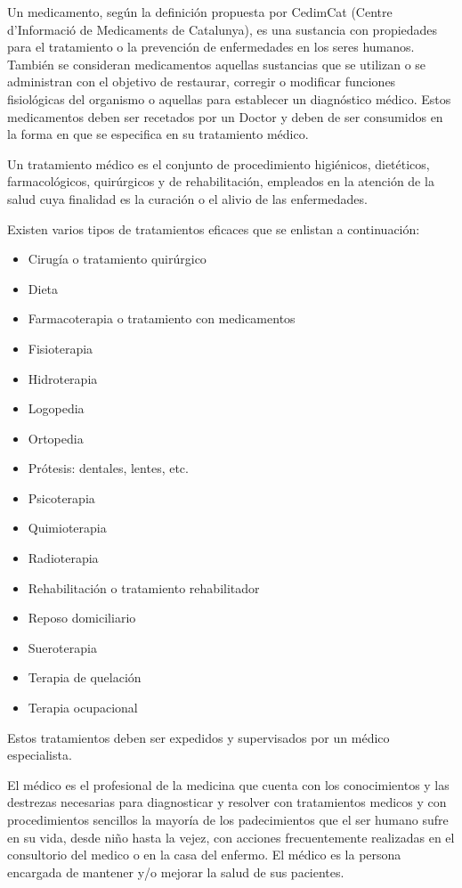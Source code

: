Un medicamento, según la definición propuesta por CedimCat (Centre d'Informació de Medicaments de Catalunya)\cite{Referencia5}, es una sustancia con propiedades para el tratamiento o la prevención de enfermedades en los seres humanos. También se consideran medicamentos aquellas sustancias que se utilizan o se administran con el objetivo de restaurar, corregir o modificar funciones fisiológicas del organismo o aquellas para establecer un diagnóstico médico. Estos medicamentos deben ser recetados por un Doctor y deben de ser consumidos en la forma en que se especifica en su tratamiento médico.

Un tratamiento médico es el conjunto de procedimiento higiénicos, dietéticos, farmacológicos, quirúrgicos y de rehabilitación, empleados en la atención de la salud\cite{Referencia6} cuya finalidad es la curación o el alivio de las enfermedades.

Existen varios tipos de tratamientos eficaces que se enlistan a continuación\cite{Referencia12}:
\begin{itemize}
	\item Cirugía o tratamiento quirúrgico
	\item Dieta
	\item Farmacoterapia o tratamiento con medicamentos
	\item Fisioterapia
	\item Hidroterapia
	\item Logopedia
	\item Ortopedia
	\item Prótesis: dentales, lentes, etc.
	\item Psicoterapia
	\item Quimioterapia
	\item Radioterapia
	\item Rehabilitación o tratamiento rehabilitador
	\item Reposo domiciliario
	\item Sueroterapia
	\item Terapia de quelación
	\item Terapia ocupacional
\end{itemize}

Estos tratamientos deben ser expedidos y supervisados por un médico especialista.

El médico es el profesional de la medicina que cuenta con los conocimientos y las destrezas necesarias para diagnosticar y resolver con tratamientos medicos y con procedimientos sencillos la mayoría de los padecimientos que el ser humano sufre en su vida, desde niño hasta la vejez, con acciones frecuentemente realizadas en el consultorio del medico o en la casa del enfermo\cite{Referencia8}. El médico es la persona encargada de mantener y/o mejorar la salud de sus pacientes.

